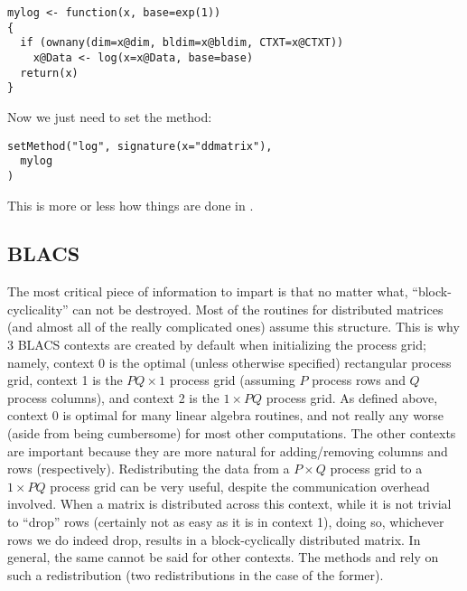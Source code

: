 \begin{lstlisting}[language=rr,title=Generating in Parallel]
mylog <- function(x, base=exp(1))
{
  if (ownany(dim=x@dim, bldim=x@bldim, CTXT=x@CTXT))
    x@Data <- log(x=x@Data, base=base)
  return(x)
}
\end{lstlisting}

Now we just need to set the method:

\begin{lstlisting}[language=rr,title=Generating in Parallel]
setMethod("log", signature(x="ddmatrix"),
  mylog
)

\end{lstlisting}

This is more or less how things are done in .

\subsection[]{BLACS}
\label{sec:ictxt}

The most critical piece of information to impart is that no matter what, ``block-cyclicality'' can not be destroyed.  Most of the routines for distributed matrices (and almost all of the really complicated ones) assume this structure.  This is why 3 BLACS contexts are created by default when initializing the process grid; namely, context 0 is the optimal (unless otherwise specified) rectangular process grid, context 1 is the $PQ\times 1$ process grid (assuming $P$ process rows and $Q$ process columns), and context 2 is the $1\times PQ$ process grid.  As defined above, context 0 is optimal for many linear algebra routines, and not really any worse (aside from being cumbersome) for most other computations.  The other contexts are important because they are more natural for adding/removing columns and rows (respectively).
\np
Redistributing the data from a $P\times Q$ process grid to a $1\times PQ$ process grid can be very useful, despite the communication overhead involved.  When a matrix is distributed across this context, while it is not trivial to ``drop'' rows (certainly not as easy as it is in context 1), doing so, whichever rows we do indeed drop, results in a block-cyclically distributed matrix.  In general, the same cannot be said for other contexts.  The  methods \code{[} and  rely on such a redistribution (two redistributions in the case of the former).